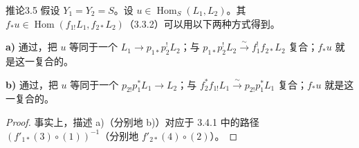 \begin{SGAresult}{推论}{3.5}
假设 $Y_1=Y_2=S$。设 $u\in\operatorname{Hom}_S(L_1,L_2)$。其 $f_*u\in\operatorname{Hom}(f_{1!}L_1,f_{2*}L_2)$（3.3.2）可以用以下两种方式得到。

\textbf{a)} 通过，把 $u$ 等同于一个 $L_1\to p_{1*}p_2^!L_2$；与 $p_{1*}p_2^!L_2\xrightarrow\sim f_1^!f_{2*}L_2$ 复合；$f_*u$ 就是这一复合的。

\textbf{b)} 通过，把 $u$ 等同于一个 $p_{2!}p_1^*L_1\to L_2$；与 $f_2^*f_{1!}L_1\xrightarrow\sim p_{2!}p_1^*L_1$ 复合；$f_*u$ 就是这一复合的。
\end{SGAresult}
\begin{proof}
事实上，描述 a)（分别地 b)）对应于 3.4.1 中的路径 $(f'_{1*}(3)\circ(1))^{-1}$（分别地 $f'_{2*}(4)\circ(2)$）。
\end{proof}


